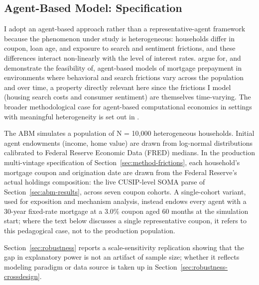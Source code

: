 \documentclass[12pt]{article}
\begin{document}
\subsection{Agent-Based Model: Specification}\label{sec:method-abm}

I adopt an agent-based approach rather than a representative-agent framework because the phenomenon under study is heterogeneous: households differ in coupon, loan age, and exposure to search and sentiment frictions, and these differences interact non-linearly with the level of interest rates. \citet{geanakoplos2012} argue for, and demonstrate the feasibility of, agent-based models of mortgage prepayment in environments where behavioral and search frictions vary across the population and over time, a property directly relevant here since the frictions I model (housing search costs and consumer sentiment) are themselves time-varying. The broader methodological case for agent-based computational economics in settings with meaningful heterogeneity is set out in \citet{tesfatsion2006}.

The ABM simulates a population of N = 10,000 heterogeneous households. Initial agent endowments (income, home value) are drawn from log-normal distributions calibrated to Federal Reserve Economic Data (FRED) medians. In the production multi-vintage specification of Section~\ref{sec:method-frictions}, each household's mortgage coupon and origination date are drawn from the Federal Reserve's actual holdings composition: the live CUSIP-level SOMA parse of Section~\ref{sec:abm-results}, across seven coupon cohorts. A single-cohort variant, used for exposition and mechanism analysis, instead endows every agent with a 30-year fixed-rate mortgage at a 3.0\% coupon aged 60 months at the simulation start; where the text below discusses a single representative coupon, it refers to this pedagogical case, not to the production population.

Section~\ref{sec:robustness} reports a scale-sensitivity replication showing that the gap in explanatory power is not an artifact of sample size; whether it reflects modeling paradigm or data source is taken up in Section~\ref{sec:robustness-crossdesign}.
\end{document}

